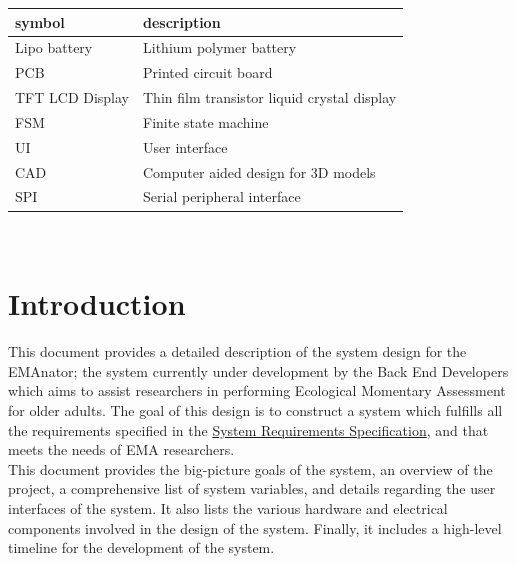\documentclass[12pt, titlepage]{article}
\begin{document}
\renewcommand{\arraystretch}{1.2}
\begin{tabular}{l l} 
  \toprule		
  \textbf{symbol} & \textbf{description}\\
  \midrule 
	Lipo battery & Lithium polymer battery\\
	PCB & Printed circuit board\\
	TFT LCD Display & Thin film transistor liquid crystal display\\
	FSM & Finite state machine\\
	UI & User interface\\
	CAD & Computer aided design for 3D models\\
	SPI & Serial peripheral interface\\

  \bottomrule
\end{tabular}\\


\newpage

\tableofcontents

\newpage

\listoftables

\listoffigures

\newpage


\section{Introduction}

This document provides a detailed description of the system design for the EMAnator; the system currently under development by the Back End Developers which aims to assist researchers in performing Ecological Momentary Assessment for older adults. The goal of this design is to construct a system which fulfills all the requirements specified in the \href{https://github.com/zakerl/Capstone_Project/blob/desDoc_Labeeb/docs/SRS/SRS.pdf}{System Requirements Specification}, and that meets the needs of EMA researchers.\\

This document provides the big-picture goals of the system, an overview of the project, a comprehensive list of system variables, and details regarding the user interfaces of the system. It also lists the various hardware and electrical components involved in the design of the system. Finally, it includes a high-level timeline for the development of the system. \\
\end{document}
